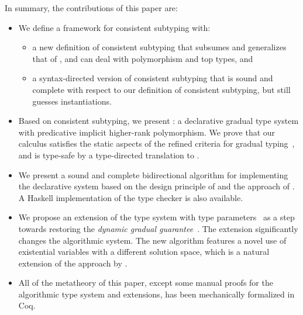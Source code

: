 In summary, the contributions of this paper are:
\begin{itemize}
\item We define a framework for consistent subtyping with:
  \begin{itemize}
  \item a new definition of consistent subtyping that subsumes and generalizes that
    of \citeauthor{siek2007gradual}, and can deal with polymorphism and top types, and
  \item a syntax-directed version of consistent subtyping that is
    sound and complete with respect to our definition of consistent
    subtyping, but still guesses instantiations.
  \end{itemize}
\item Based on consistent subtyping, we present \name: a declarative gradual type
  system with predicative implicit higher-rank polymorphism. We prove that our calculus
  satisfies the static aspects of the refined criteria for gradual
  typing~\citep{siek2015refined}, and is type-safe by a type-directed
  translation to \pbc\citep{ahmed2011blame}.
\item We present a sound and complete bidirectional algorithm for implementing
  the declarative system based on the design principle of
  \citet{garcia2015principal} and the approach of \citet{dunfield2013complete}.
  A Haskell implementation of the type checker is also available.
\item We propose an extension of the type system with type
  parameters~\citep{garcia2015principal} as a step towards restoring the
  \emph{dynamic gradual guarantee}~\citep{siek2015refined}. The extension
  significantly changes the algorithmic system. The new algorithm features a novel
  use of existential variables with a different solution space, which is a natural extension
  of the approach by \citet{dunfield2013complete}.
\item All of the metatheory of this paper, except some manual proofs for the
  algorithmic type system and extensions, has been mechanically formalized in
  Coq.
\end{itemize}



